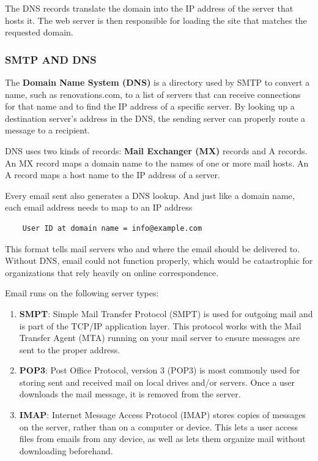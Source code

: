\documentclass[11pt]{article}
\begin{document}
The DNS records translate the domain into the IP address of the server that hosts it. The web server is then responsible for loading the site that matches the requested domain.

\subsubsection{SMTP AND DNS}
The \textbf{Domain Name System (DNS)} is a directory used by SMTP to convert a name, such as renovations.com, to a list of servers that can receive connections for that name and to find the IP address of a specific server. By looking up a destination server's address in the DNS, the sending server can properly route a message to a recipient.

DNS uses two kinds of records: \textbf{Mail Exchanger (MX)} records and A records. An MX record maps a domain name to the names of one or more mail hosts. An A record maps a host name to the IP address of a server.

Every email sent also generates a DNS lookup. And just like a domain name, each email address needs to map to an IP address
\begin{verbatim}
	User ID at domain name = info@example.com
\end{verbatim}

This format tells mail servers who and where the email should be delivered to. Without DNS, email could not function properly, which would be catastrophic for organizations that rely heavily on online correspondence.

Email runs on the following server types:
\begin{enumerate}
	\item \textbf{SMPT}: Simple Mail Transfer Protocol (SMPT) is used for outgoing mail and is part of the TCP/IP application layer. This protocol works with the Mail Transfer Agent (MTA) running on your mail server to ensure messages are sent to the proper address.
	\item \textbf{POP3}: Post Office Protocol, version 3 (POP3) is most commonly used for storing sent and received mail on local drives and/or servers. Once a user downloads the mail message, it is removed from the server.
	\item \textbf{IMAP}: Internet Message Access Protocol (IMAP) stores copies of messages on the server, rather than on a computer or device. This lets a user access files from emails from any device, as well as lets them organize mail without downloading beforehand.
\end{enumerate}
\end{document}
